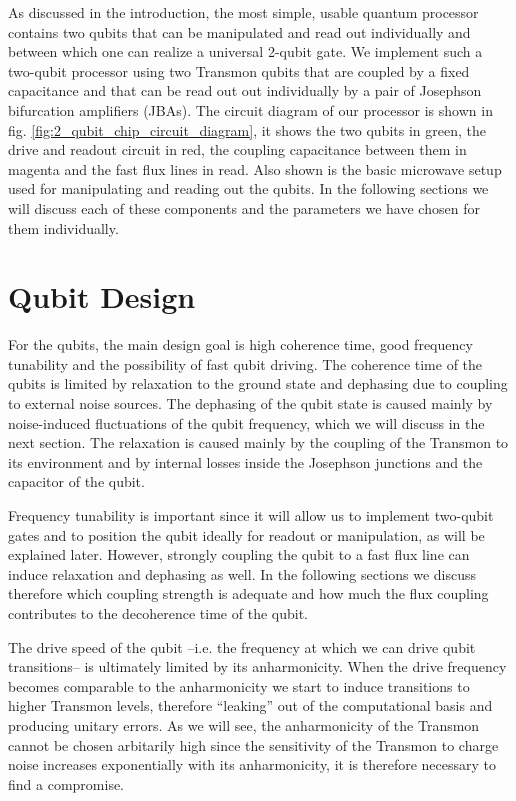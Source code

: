 As discussed in the introduction, the most simple, usable quantum processor contains two qubits that can be manipulated and read out individually and between which one can realize a universal 2-qubit gate. We implement such a two-qubit processor using two Transmon qubits that are coupled by a fixed capacitance and that can be read out out individually by a pair of Josephson bifurcation amplifiers (JBAs). The circuit diagram of our processor is shown in fig. \ref{fig:2_qubit_chip_circuit_diagram}, it shows the two qubits in green, the drive and readout circuit in red, the coupling capacitance between them in magenta and the fast flux lines in read. Also shown is the basic microwave setup used for manipulating and reading out the qubits. In the following sections we will discuss each of these components and the parameters we have chosen for them individually.

\section{Qubit Design}

For the qubits, the main design goal is high coherence time, good frequency tunability and the possibility of fast qubit driving. The coherence time of the qubits is limited by relaxation to the ground state and dephasing due to coupling to external noise sources. The dephasing of the qubit state is caused mainly by noise-induced fluctuations of the qubit frequency, which we will discuss in the next section. The relaxation is caused mainly by the coupling of the Transmon to its environment and by internal losses inside the Josephson junctions and the capacitor of the qubit. 

Frequency tunability is important since it will allow us to implement two-qubit gates and to position the qubit ideally for readout or manipulation, as will be explained later. However, strongly coupling the qubit to a fast flux line can induce relaxation and dephasing as well. In the following sections we discuss therefore which coupling strength is adequate and how much the flux coupling contributes to the decoherence time of the qubit.

The drive speed of the qubit --i.e. the frequency at which we can drive qubit transitions-- is ultimately limited by its anharmonicity. When the drive frequency becomes comparable to the anharmonicity we start to induce transitions to higher Transmon levels, therefore ``leaking'' out of the computational basis and producing unitary errors. As we will see, the anharmonicity of the Transmon cannot be chosen arbitarily high since the sensitivity of the Transmon to charge noise increases exponentially with its anharmonicity, it is therefore necessary to find a compromise.

